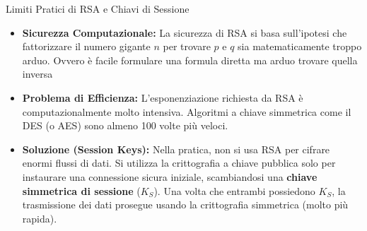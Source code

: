 \documentclass[a4paper,12pt]{report}
\begin{document}
\begin{urgentbox}{Limiti Pratici di RSA e Chiavi di Sessione}
\begin{itemize}
    \item \textbf{Sicurezza Computazionale:} La sicurezza di RSA si basa sull'ipotesi che fattorizzare il numero gigante $n$ per trovare $p$ e $q$ sia matematicamente troppo arduo. Ovvero è facile formulare una formula diretta ma arduo trovare quella inversa
    \item \textbf{Problema di Efficienza:} L'esponenziazione richiesta da RSA è computazionalmente molto intensiva. Algoritmi a chiave simmetrica come il DES (o AES) sono almeno 100 volte più veloci.
    \item \textbf{Soluzione (Session Keys):} Nella pratica, non si usa RSA per cifrare enormi flussi di dati. Si utilizza la crittografia a chiave pubblica solo per instaurare una connessione sicura iniziale, scambiandosi una \textbf{chiave simmetrica di sessione} ($K_S$). Una volta che entrambi possiedono $K_S$, la trasmissione dei dati prosegue usando la crittografia simmetrica (molto più rapida).
\end{itemize}
\end{urgentbox}
\end{document}
